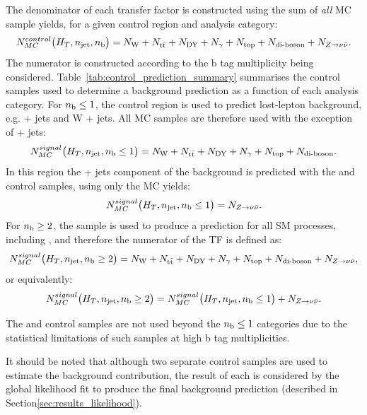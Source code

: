 The denominator of each transfer factor is constructed using the sum of
\textit{all} MC sample yields, for a given control region and
analysis category:
% 
\begin{equation}
N_{MC}^{control}\big(H_T, n_{\text{jet}}, n_{\text{b}}\big) = N_{\text{W}} + N_{\text{t}\bar{\text{t}}} + N_{\text{DY}} + N_{\gamma} + 
N_{\text{top}} + N_{\text{di-boson}} + N_{Z \to \nu\bar{\nu}} .
\label{eq:trans_fact_denom}
\end{equation}
% 
The numerator is constructed according to the b tag multiplicity being 
considered. Table~\ref{tab:control_prediction_summary} summarises the control
samples used to determine a background prediction as a function of each analysis
category. For $n_{\text{b}} \leq 1$, the \mj control region is used to predict 
lost-lepton background, e.g. \ttbar + jets and W + jets. All MC samples
are therefore used with the exception of \zinv + jets:
% 
\begin{equation}
N_{MC}^{signal}\big(H_T, n_{\text{jet}}, n_{\text{b}} \leq 1\big) = N_{\text{W}} + N_{\text{t}\bar{\text{t}}} + N_{\text{DY}} + N_{\gamma} + 
N_{\text{top}} + N_{\text{di-boson}} .
\label{eq:trans_fact_num_le1b_noz}
\end{equation}
% 
In this \nb region the \zinv + jets component of the background is predicted
with the \mmj and \gj control samples, using only the \zinv MC yields:
% 
\begin{equation}
N_{MC}^{signal}\big(H_T, n_{\text{jet}}, n_{\text{b}} \leq 1 \big) = N_{Z \to \nu\bar{\nu}} .
\label{eq:trans_fact_num_le1b_z}
\end{equation}
%
For $n_{\text{b}} \geq 2$, the \mj sample is used to produce a prediction for all 
SM processes, including \zinv, and therefore the numerator of the TF is defined as:
% 
\begin{equation}
N_{MC}^{signal}\big(H_T, n_{\text{jet}}, n_{\text{b}} \geq 2 \big) = N_{\text{W}} + N_{\text{t}\bar{\text{t}}} + N_{\text{DY}} + N_{\gamma} + 
N_{\text{top}} + N_{\text{di-boson}} + N_{Z \to \nu\bar{\nu}} ,
\label{eq:trans_fact_num_geq2b}
\end{equation}
% 
or equivalently:
% 
\begin{equation}
N_{MC}^{signal}\big(H_T, n_{\text{jet}}, n_{\text{b}} \geq 2 \big) = N_{MC}^{signal}\big(H_T, n_{\text{jet}}, n_{\text{b}} \leq 1\big) + N_{Z \to \nu\bar{\nu}} .
\end{equation}

The \mmj and \gj control samples are not used beyond the $n_{\text{b}} \leq 1$ categories
due to the statistical limitations of such samples at high b tag multiplicities.

It should be noted that although two separate control samples are 
used to estimate the \zinv background contribution, the result of each is
considered by the global likelihood fit to produce the final background
prediction (described in Section\ref{sec:results_likelihood}).

